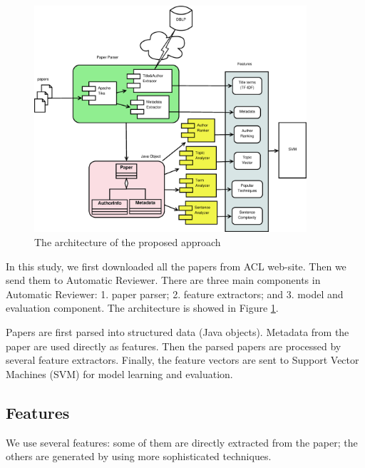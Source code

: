 \documentclass[11pt,letterpaper]{article}
\begin{document}
\begin{figure}[htb]
  \centering
	 	 \includegraphics[width=0.9\textwidth]{materials/architecture.eps}
		\caption{The architecture of the proposed approach}
		\label{fig:architecture}
\end{figure}
In this study, we first downloaded all the papers from ACL web-site. Then we send them to Automatic Reviewer. There are three main components in Automatic Reviewer: 1. paper parser; 2. feature extractors; and 3. model and evaluation component. 
The architecture is showed in Figure \ref{fig:architecture}.

Papers are first parsed into structured data (Java objects). Metadata from the paper are used directly as features. Then the parsed papers are processed by several feature extractors. Finally, the feature vectors are sent to Support Vector Machines (SVM) for model learning and evaluation.




\subsection{Features}
We use several features: some of them are directly extracted from the paper; 
the others are generated by using more sophisticated techniques.
\end{document}
